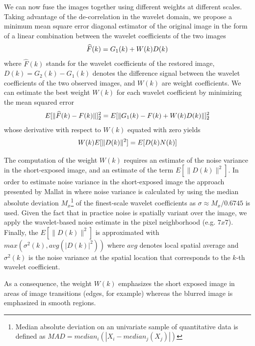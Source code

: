 \documentclass[12pt,notitlepage]{report}
\begin{document}
We can now fuse the images together using different weights at different scales.  Taking advantage of the de-correlation in the wavelet domain, we propose a minimum mean square error diagonal estimator of the original image in the form of a linear combination between the wavelet coefficients of the two images
\begin{equation}
\label{eq:tico09_estimator}
	\widehat{F}(k) = G_1(k) + W(k)D(k) \\
\end{equation}
where $\widehat{F}(k)$ stands for the wavelet coefficients of the restored image, $D(k) = G_2(k) - G_1(k)$ denotes the difference signal between the wavelet coefficients of the two observed images, and $W(k)$ are weight coefficients.  We can estimate the best weight $W(k)$ for each wavelet coefficient by minimizing the mean squared error
\begin{equation}
\label{eq:tico09_weight}
	E[\|\widehat{F}(k)- F(k)\|]_2^2 = E[\|G_1(k) - F(k) + W(k)D(k)\|]_2^2 \\
\end{equation}
whose derivative with respect to $W(k)$ equated with zero yields
\begin{equation}
\label{eq:tico09_weight_derivative}
	W(k)E[\|D(k)\|^2] = E[D(k)N(k)] \\
\end{equation}

The computation of the weight $W(k)$ requires an estimate of the noise variance in the short-exposed image, and an estimate of the term $E[\|D(k)\|^2]$.  In order to estimate noise variance in the short-exposed image the approach presented by Mallat in \cite{mall09} where noise variance is calculated by using the median absolute deviation $M_x$\footnote[5]{Median absolute deviation on an univariate sample of quantitative data is defined as $MAD = median_i( | X_i - median_j(X_j)|) $} of the finest-scale wavelet coefficients  as $\sigma \approx M_x/0.6745$ is used. Given the fact that in practice noise is spatially variant over the image, we apply the wavelet-based noise estimate in the pixel neighborhood (e.g. $7x7$). Finally, the $E[\|D(k)\|^2]$ is approximated with $max(\sigma^2(k),avg(|D(k)|^2))$ where $avg$ denotes local spatial average and $\sigma^2(k)$ is the noise variance at the spatial location that corresponds to the $k$-th wavelet coefficient.

As a consequence, the weight $W(k)$ emphasizes the short exposed image in areas of image transitions (edges, for example) whereas the blurred image is emphasized in smooth regions. 
\end{document}
